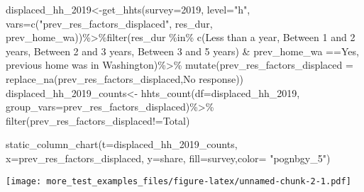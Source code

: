 \documentclass[
]{article}
\newenvironment{Shaded}{\begin{snugshade}}{\end{snugshade}}
\newcommand{\AttributeTok}[1]{\textcolor[rgb]{0.77,0.63,0.00}{#1}}
\newcommand{\FunctionTok}[1]{\textcolor[rgb]{0.00,0.00,0.00}{#1}}
\newcommand{\NormalTok}[1]{#1}
\newcommand{\OtherTok}[1]{\textcolor[rgb]{0.56,0.35,0.01}{#1}}
\newcommand{\SpecialCharTok}[1]{\textcolor[rgb]{0.00,0.00,0.00}{#1}}
\newcommand{\StringTok}[1]{\textcolor[rgb]{0.31,0.60,0.02}{#1}}
\begin{document}
\begin{Shaded}
\begin{Highlighting}[]
\NormalTok{displaced\_hh\_2019}\OtherTok{\textless{}{-}}\FunctionTok{get\_hhts}\NormalTok{(}\AttributeTok{survey=}\StringTok{\textquotesingle{}2019\textquotesingle{}}\NormalTok{, }\AttributeTok{level=}\StringTok{"h"}\NormalTok{, }\AttributeTok{vars=}\FunctionTok{c}\NormalTok{(}\StringTok{"prev\_res\_factors\_displaced"}\NormalTok{, }\StringTok{\textquotesingle{}res\_dur\textquotesingle{}}\NormalTok{, }\StringTok{\textquotesingle{}prev\_home\_wa\textquotesingle{}}\NormalTok{))}\SpecialCharTok{\%\textgreater{}\%}\FunctionTok{filter}\NormalTok{(res\_dur }\SpecialCharTok{\%in\%} \FunctionTok{c}\NormalTok{(}\StringTok{\textquotesingle{}Less than a year\textquotesingle{}}\NormalTok{, }\StringTok{\textquotesingle{}    Between 1 and 2 years\textquotesingle{}}\NormalTok{, }\StringTok{\textquotesingle{}Between 2 and 3 years\textquotesingle{}}\NormalTok{,    }\StringTok{\textquotesingle{}Between 3 and 5 years\textquotesingle{}}\NormalTok{) }\SpecialCharTok{\&}\NormalTok{ prev\_home\_wa }\SpecialCharTok{==}\StringTok{\textquotesingle{}Yes, previous home was in Washington\textquotesingle{}}\NormalTok{)}\SpecialCharTok{\%\textgreater{}\%} \FunctionTok{mutate}\NormalTok{(}\AttributeTok{prev\_res\_factors\_displaced =} \FunctionTok{replace\_na}\NormalTok{(prev\_res\_factors\_displaced,}\StringTok{\textquotesingle{}No response\textquotesingle{}}\NormalTok{))}
\NormalTok{displaced\_hh\_2019\_counts}\OtherTok{\textless{}{-}} \FunctionTok{hhts\_count}\NormalTok{(}\AttributeTok{df=}\NormalTok{displaced\_hh\_2019, }\AttributeTok{group\_vars=}\StringTok{\textquotesingle{}prev\_res\_factors\_displaced\textquotesingle{}}\NormalTok{)}\SpecialCharTok{\%\textgreater{}\%}
\FunctionTok{filter}\NormalTok{(prev\_res\_factors\_displaced}\SpecialCharTok{!=}\StringTok{\textquotesingle{}Total\textquotesingle{}}\NormalTok{)}

\FunctionTok{static\_column\_chart}\NormalTok{(}\AttributeTok{t=}\NormalTok{displaced\_hh\_2019\_counts, }\AttributeTok{x=}\StringTok{\textquotesingle{}prev\_res\_factors\_displaced\textquotesingle{}}\NormalTok{, }\AttributeTok{y=}\StringTok{\textquotesingle{}share\textquotesingle{}}\NormalTok{, }\AttributeTok{fill=}\StringTok{\textquotesingle{}survey\textquotesingle{}}\NormalTok{,}\AttributeTok{color=}  \StringTok{"pognbgy\_5"}\NormalTok{)}
\end{Highlighting}
\end{Shaded}

\texttt{[image: more\_test\_examples\_files/figure-latex/unnamed-chunk-2-1.pdf]}
\end{document}
